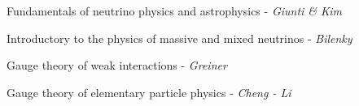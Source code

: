 \documentclass[a4paper,10pt]{article}
\begin{document}
\begin{thebibliography}{4}
Fundamentals of neutrino physics and astrophysics - \textit{Giunti \& Kim}

Introductory to the physics of massive and mixed neutrinos  - \textit{Bilenky}

Gauge theory of weak interactions - \textit{Greiner}

Gauge theory of elementary particle physics - \textit{Cheng - Li}

\end{thebibliography}
\end{document}
